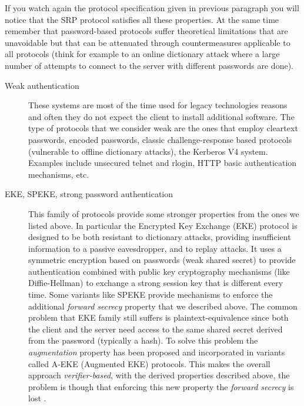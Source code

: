 \documentclass[11pt]{article}
\begin{document}
If you watch again the protocol specification given in previous paragraph you will notice that the SRP protocol satisfies all these properties. At the same time remember that password-based protocols suffer theoretical limitations that are unavoidable but that can be attenuated through countermeasures applicable to all protocols (think for example to an online dictionary attack where  a large number of attempts to connect to the server with different passwords are done).

\begin{description}
	\item [Weak authentication] These systems are most of the time used for legacy technologies reasons and often they do not expect the client to install additional software. The type of protocols that we consider weak are the ones that employ cleartext passwords, encoded passwords, classic challenge-response based protocols (vulnerable to offline dictionary attacks), the Kerberos V4 system. Examples include unsecured telnet and rlogin, HTTP basic authentication mechanisms, etc.
	\item [EKE, SPEKE, strong password authentication] This family of protocols provide some stronger properties from the ones we listed above. In particular the Encrypted Key Exchange (EKE) protocol is designed to be both resistant to dictionary attacks, providing insufficient information to a passive eavesdropper, and to replay attacks. It uses a symmetric encryption based on passwords (weak shared secret) to provide authentication combined with public key cryptography mechanisms (like Diffie-Hellman) to exchange a strong session key that is different every time. Some variants like SPEKE provide mechanisms to enforce the additional \emph{forward secrecy} property that we described above. The common problem that EKE family still suffers is plaintext-equivalence since both the client and the server need access to the same shared secret derived from the password (typically a hash). To solve this problem the \emph{augmentation} property has been proposed and incorporated in variants called A-EKE (Augmented EKE) protocols. This makes the overall approach \emph{verifier-based}, with the derived properties described above, the problem is though that enforcing this new property the \emph{forward secrecy} is lost \cite{aeke}.
	

\end{description}
\end{document}
